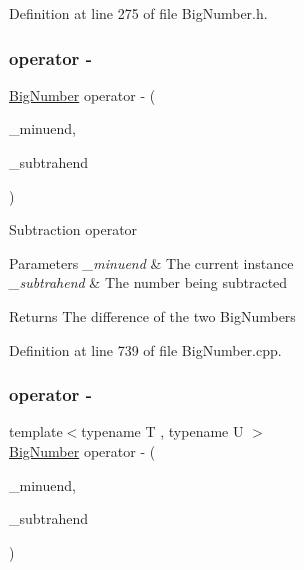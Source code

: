 Definition at line 275 of file Big\+Number.\+h.

\mbox{\label{class_big_nums_1_1_big_number_a9a4cb9889d9180fb6bc9bfdb1de1e8b9}} 
\subsubsection{\texorpdfstring{operator -\/}{operator -}\hspace{0.1cm}{\footnotesize\ttfamily [1/3]}}
{\footnotesize\ttfamily \mbox{\hyperlink{class_big_nums_1_1_big_number}{Big\+Number}} operator -\/ (\begin{DoxyParamCaption}\item[{\mbox{\hyperlink{class_big_nums_1_1_big_number}{Big\+Number}}}]{\+\_\+minuend,  }\item[{const \mbox{\hyperlink{class_big_nums_1_1_big_number}{Big\+Number}} \&}]{\+\_\+subtrahend }\end{DoxyParamCaption})\hspace{0.3cm}{\ttfamily [friend]}}

Subtraction operator 
\begin{DoxyParams}{Parameters}
{\em \+\_\+minuend} & The current instance \\
\hline
{\em \+\_\+subtrahend} & The number being subtracted \\
\hline
\end{DoxyParams}
\begin{DoxyReturn}{Returns}
The difference of the two Big\+Numbers 
\end{DoxyReturn}


Definition at line 739 of file Big\+Number.\+cpp.

\mbox{\label{class_big_nums_1_1_big_number_abafc9bc65d3cf2b1a87fe226d37b107c}} 
\subsubsection{\texorpdfstring{operator -\/}{operator -}\hspace{0.1cm}{\footnotesize\ttfamily [2/3]}}
{\footnotesize\ttfamily template$<$typename T , typename U $>$ \\
\mbox{\hyperlink{class_big_nums_1_1_big_number}{Big\+Number}} operator -\/ (\begin{DoxyParamCaption}\item[{const T \&}]{\+\_\+minuend,  }\item[{const U \&}]{\+\_\+subtrahend }\end{DoxyParamCaption})\hspace{0.3cm}{\ttfamily [friend]}}



